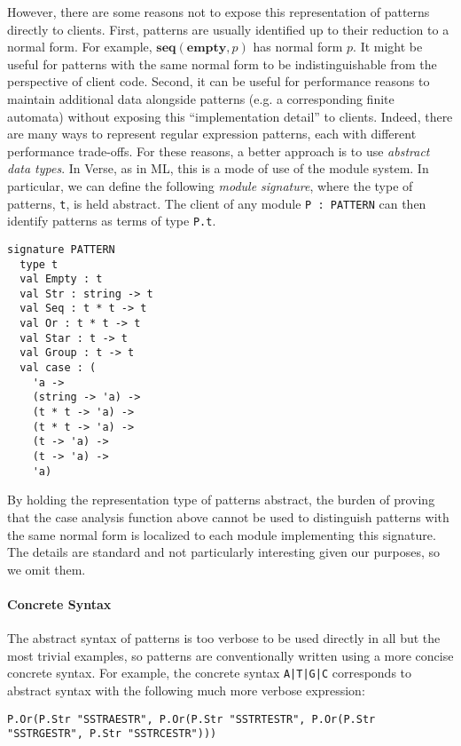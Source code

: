 However, there are some reasons not to expose this representation of patterns directly to clients. First, patterns are usually identified up to their reduction to a normal form. For example, $\textbf{seq}(\textbf{empty}, p)$ has normal form $p$. It might be useful for patterns with the same normal form to be  indistinguishable from the perspective of client code. Second, it can be useful for performance reasons to maintain additional data alongside patterns (e.g. a corresponding finite automata) without exposing this ``implementation detail'' to clients. Indeed, there are many ways to represent regular expression patterns, each with different performance trade-offs. For these reasons, a better approach is to use \emph{abstract data types}. In Verse, as in ML, this is a mode of use of the module system. In particular, we can define the following \emph{module signature}, where the type of patterns, \lstinline{t}, is held abstract. The client of any module \lstinline{P : PATTERN} can then identify patterns as terms of type \verb|P.t|. 

\begin{lstlisting}[deletekeywords={case},numbers=none]
signature PATTERN
  type t
  val Empty : t
  val Str : string -> t
  val Seq : t * t -> t
  val Or : t * t -> t
  val Star : t -> t
  val Group : t -> t
  val case : (
    'a -> 
    (string -> 'a) ->
    (t * t -> 'a) ->
    (t * t -> 'a) ->
    (t -> 'a) ->
    (t -> 'a) -> 
    'a)
\end{lstlisting}
By holding the representation type of patterns abstract, the burden of proving that the case analysis function above cannot be used to distinguish patterns with the same normal form is localized to each module implementing this signature. The details are standard and not particularly interesting given our purposes, so we omit them.

\paragraph{Concrete Syntax} The abstract syntax of patterns is too verbose to be used directly in all but the most trivial examples, so patterns are conventionally written using a more concise concrete syntax. For example, the concrete syntax \lstinline{A|T|G|C} corresponds to abstract syntax with the following much more verbose expression:
\begin{lstlisting}[numbers=none,mathescape=|]
P.Or(P.Str "SSTRAESTR", P.Or(P.Str "SSTRTESTR", P.Or(P.Str "SSTRGESTR", P.Str "SSTRCESTR")))
\end{lstlisting} 



